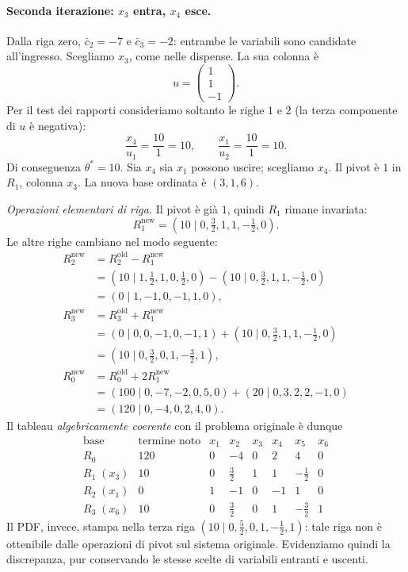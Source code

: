 \paragraph{Seconda iterazione: $x_3$ entra, $x_4$ esce.}
Dalla riga zero, $\bar c_2=-7$ e $\bar c_3=-2$: entrambe le variabili sono candidate all'ingresso. Scegliamo $x_3$, come nelle dispense. La sua colonna \`e
\[
u=\begin{pmatrix}1\\1\\-1\end{pmatrix}.
\]
Per il test dei rapporti consideriamo soltanto le righe $1$ e $2$ (la terza componente di $u$ \`e negativa):
\[
\frac{x_4}{u_1}=\frac{10}{1}=10,\qquad
\frac{x_1}{u_2}=\frac{10}{1}=10.
\]
Di conseguenza $\theta^*=10$. Sia $x_4$ sia $x_1$ possono uscire; scegliamo $x_4$. Il pivot \`e $1$ in $R_1$, colonna $x_3$. La nuova base ordinata \`e $(3,1,6)$.

\emph{Operazioni elementari di riga.} Il pivot \`e gi\`a $1$, quindi $R_1$ rimane invariata:
\[
R_1^{\mathrm{new}}=\left(10\mid0,\tfrac32,1,1,-\tfrac12,0\right).
\]
Le altre righe cambiano nel modo seguente:
\[
\begin{aligned}
R_2^{\mathrm{new}}&=R_2^{\mathrm{old}}-R_1^{\mathrm{new}}\\
&=\left(10\mid1,\tfrac12,1,0,\tfrac12,0\right)
-\left(10\mid0,\tfrac32,1,1,-\tfrac12,0\right)\\
&=\left(0\mid1,-1,0,-1,1,0\right),\\[3pt]
R_3^{\mathrm{new}}&=R_3^{\mathrm{old}}+R_1^{\mathrm{new}}\\
&=\left(0\mid0,0,-1,0,-1,1\right)
+\left(10\mid0,\tfrac32,1,1,-\tfrac12,0\right)\\
&=\left(10\mid0,\tfrac32,0,1,-\tfrac32,1\right),\\[3pt]
R_0^{\mathrm{new}}&=R_0^{\mathrm{old}}+2R_1^{\mathrm{new}}\\
&=\left(100\mid0,-7,-2,0,5,0\right)
+\left(20\mid0,3,2,2,-1,0\right)\\
&=\left(120\mid0,-4,0,2,4,0\right).
\end{aligned}
\]
Il tableau \emph{algebricamente coerente} con il problema originale \`e dunque
\[
\begin{array}{c|r|rrrrrr}
\text{base}&\text{termine noto}&x_1&x_2&x_3&x_4&x_5&x_6\\\hline
R_0&120&0&-4&0&2&4&0\\\hline
R_1\;(x_3)&10&0&\tfrac32&1&1&-\tfrac12&0\\
R_2\;(x_1)&0&1&-1&0&-1&1&0\\
R_3\;(x_6)&10&0&\boxed{\tfrac32}&0&1&-\tfrac32&1
\end{array}
\]
Il PDF, invece, stampa nella terza riga $(10\mid0,\frac52,0,1,-\frac12,1)$: tale riga non \`e ottenibile dalle operazioni di pivot sul sistema originale. Evidenziamo quindi la discrepanza, pur conservando le stesse scelte di variabili entranti e uscenti.

